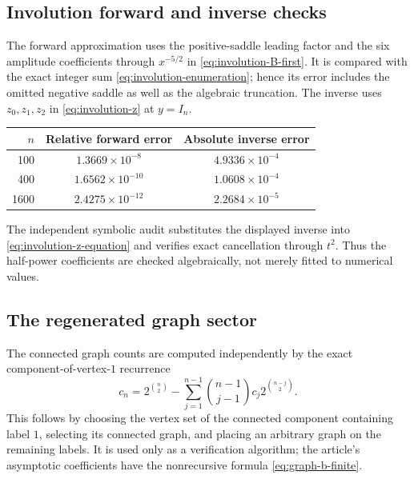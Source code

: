 \documentclass[11pt,a4paper]{article}
\numberwithin{equation}{section}
\theoremstyle{definition}
\theoremstyle{remark}
\begin{document}
\subsection{Involution forward and inverse checks}

The forward approximation uses the positive-saddle leading factor and the six amplitude coefficients through $x^{-5/2}$ in \eqref{eq:involution-B-first}. It is compared with the exact integer sum \eqref{eq:involution-enumeration}; hence its error includes the omitted negative saddle as well as the algebraic truncation. The inverse uses $z_0,z_1,z_2$ in \eqref{eq:involution-z} at $y=I_n$.
\begin{center}
\begin{tabular}{rcc}
\toprule
$n$ & Relative forward error & Absolute inverse error\\\midrule
100 & $1.3669\times10^{-8}$ & $4.9336\times10^{-4}$\\
400 & $1.6562\times10^{-10}$ & $1.0608\times10^{-4}$\\
1600 & $2.4275\times10^{-12}$ & $2.2684\times10^{-5}$\\\bottomrule
\end{tabular}
\end{center}
The independent symbolic audit substitutes the displayed inverse into \eqref{eq:involution-z-equation} and verifies exact cancellation through $t^2$. Thus the half-power coefficients are checked algebraically, not merely fitted to numerical values.

\subsection{The regenerated graph sector}

The connected graph counts are computed independently by the exact component-of-vertex-$1$ recurrence
\begin{equation}
 c_n=2^{\binom n2}-\sum_{j=1}^{n-1}
         \binom{n-1}{j-1}c_j2^{\binom{n-j}{2}}.
 \label{eq:graph-check-recurrence}
\end{equation}
This follows by choosing the vertex set of the connected component containing label $1$, selecting its connected graph, and placing an arbitrary graph on the remaining labels. It is used only as a verification algorithm; the article's asymptotic coefficients have the nonrecursive formula \eqref{eq:graph-b-finite}.
\end{document}
